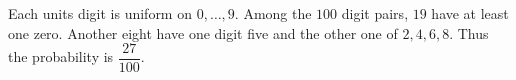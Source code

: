 Each units digit is uniform on $0,\ldots,9$. Among the $100$ digit pairs, $19$ have at least one zero. Another eight have one digit five and the other one of $2,4,6,8$. Thus the probability is $\boxed{\dfrac{27}{100}}$.
